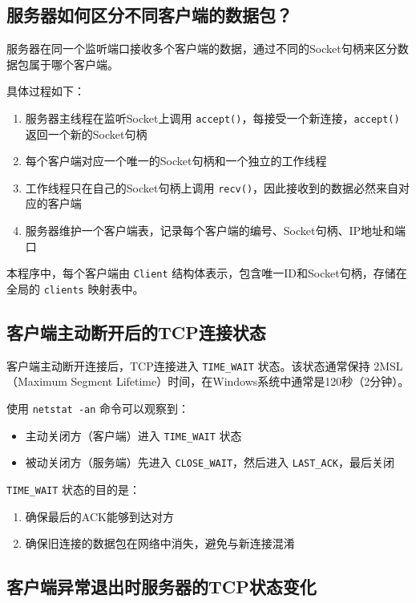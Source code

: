 \documentclass[12pt,a4paper]{article}
\begin{document}
\subsection{服务器如何区分不同客户端的数据包？}

服务器在同一个监听端口接收多个客户端的数据，通过不同的Socket句柄来区分数据包属于哪个客户端。

具体过程如下：
\begin{enumerate}
    \item 服务器主线程在监听Socket上调用 \texttt{accept()}，每接受一个新连接，\texttt{accept()} 返回一个新的Socket句柄
    \item 每个客户端对应一个唯一的Socket句柄和一个独立的工作线程
    \item 工作线程只在自己的Socket句柄上调用 \texttt{recv()}，因此接收到的数据必然来自对应的客户端
    \item 服务器维护一个客户端表，记录每个客户端的编号、Socket句柄、IP地址和端口
\end{enumerate}

本程序中，每个客户端由 \texttt{Client} 结构体表示，包含唯一ID和Socket句柄，存储在全局的 \texttt{clients} 映射表中。

\subsection{客户端主动断开后的TCP连接状态}

客户端主动断开连接后，TCP连接进入 \texttt{TIME\_WAIT} 状态。该状态通常保持 2MSL（Maximum Segment Lifetime）时间，在Windows系统中通常是120秒（2分钟）。

使用 \texttt{netstat -an} 命令可以观察到：
\begin{itemize}
    \item 主动关闭方（客户端）进入 \texttt{TIME\_WAIT} 状态
    \item 被动关闭方（服务端）先进入 \texttt{CLOSE\_WAIT}，然后进入 \texttt{LAST\_ACK}，最后关闭
\end{itemize}

\texttt{TIME\_WAIT} 状态的目的是：
\begin{enumerate}
    \item 确保最后的ACK能够到达对方
    \item 确保旧连接的数据包在网络中消失，避免与新连接混淆
\end{enumerate}

\subsection{客户端异常退出时服务器的TCP状态变化}
\end{document}
